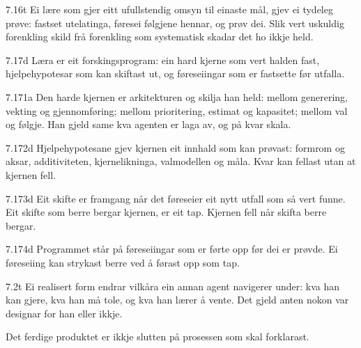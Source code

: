 \begin{formproposition}{7.16}{t}
Ei lære som gjer eitt ufullstendig omsyn til einaste mål, gjev ei tydeleg prøve: fastset utelatinga, føresei følgjene hennar, og prøv dei. Slik vert uskuldig forenkling skild frå forenkling som systematisk skadar det ho ikkje held.
\end{formproposition}

\begin{formproposition}{7.17}{d}
Læra er eit forskingsprogram: ein hard kjerne som vert halden fast, hjelpehypotesar som kan skiftast ut, og føreseiingar som er fastsette før utfalla.
\end{formproposition}

\begin{formproposition}{7.171}{a}
Den harde kjernen er arkitekturen og skilja han held: mellom generering, vekting og gjennomføring; mellom prioritering, estimat og kapasitet; mellom val og følgje. Han gjeld same kva agenten er laga av, og på kvar skala.
\end{formproposition}

\begin{formproposition}{7.172}{d}
Hjelpehypotesane gjev kjernen eit innhald som kan prøvast: formrom og aksar, additiviteten, kjernelikninga, valmodellen og måla. Kvar kan fellast utan at kjernen fell.
\end{formproposition}

\begin{formproposition}{7.173}{d}
Eit skifte er framgang når det føreseier eit nytt utfall som så vert funne. Eit skifte som berre bergar kjernen, er eit tap. Kjernen fell når skifta berre bergar.
\end{formproposition}

\begin{formproposition}{7.174}{d}
Programmet står på føreseiingar som er førte opp før dei er prøvde. Ei føreseiing kan strykast berre ved å førast opp som tap.
\end{formproposition}

\begin{formproposition}{7.2}{t}
Ei realisert form endrar vilkåra ein annan agent navigerer under: kva han kan gjere, kva han må tole, og kva han lærer å vente. Det gjeld anten nokon var designar for han eller ikkje.

Det ferdige produktet er ikkje slutten på prosessen som skal forklarast.
\end{formproposition}

